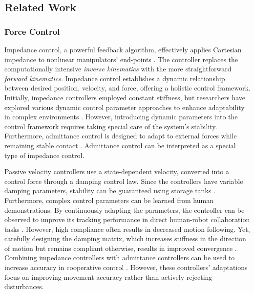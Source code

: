 \subsection{Related Work}

\subsubsection{Force Control}
Impedance control, a powerful feedback algorithm, effectively applies Cartesian impedance to nonlinear manipulators' end-points \iflong \parencite{takegaki1981new, hogan1985impedance} \else \parencite{hogan1985impedance} \fi. The controller replaces the computationally intensive \textit{inverse kinematics} with the more straightforward \textit{forward kinematics}. Impedance control establishes a dynamic relationship between desired position, velocity, and force, offering a holistic control framework.
Initially, impedance controllers employed constant stiffness, but researchers have explored various dynamic control parameter approaches to enhance adaptability in complex environments \parencite{vanderborght2013variable, abu2020variable}. However, introducing dynamic parameters into the control framework requires taking special care of the system's stability.
Furthermore, admittance control is designed to adapt to external forces while remaining stable contact \parencite{glosser1994implementation}. Admittance control can be interpreted as a special type of impedance control.

Passive velocity controllers use a state-dependent velocity, converted into a control force through a damping control law. Since the controllers have variable damping parameters, stability can be guaranteed using storage tanks \parencite{li1999passive}. 
\iflong
Furthermore, complex control parameters can be learned from human demonstrations. By continuously adapting the parameters, the controller can be observed to improve its tracking performance in direct human-robot collaboration tasks \parencite{gribovskaya2011motion}.
\fi
However, high compliance often results in decreased motion following. Yet, carefully designing the damping matrix, which increases stiffness in the direction of motion but remains compliant otherwise, results in improved convergence \parencite{kronander2015passive}. 
Combining impedance controllers with admittance controllers can be used to increase accuracy in cooperative control
\parencite{fujiki2022series}.
However, these controllers' adaptations focus on improving movement accuracy rather than actively rejecting disturbances.

